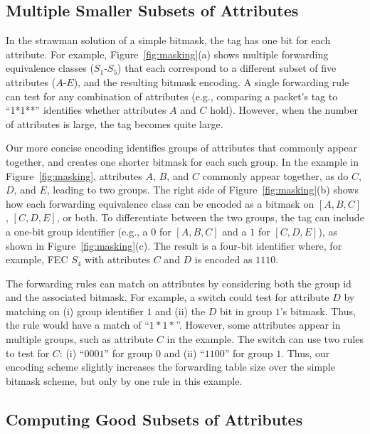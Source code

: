 \subsection{Multiple Smaller Subsets of Attributes}
\label{ssec:mset}
In the strawman solution of a simple bitmask, the tag has one bit for
each attribute.  For example, Figure~\ref{fig:masking}(a) shows
multiple forwarding equivalence classes ($S_1$-$S_5$) that each
correspond to a different subset of five attributes ($A$-$E$), and the
resulting bitmask encoding.  A single forwarding rule can test for any
combination of attributes (e.g., comparing a packet's tag to ``1*1**''
identifies whether attributes $A$ and $C$ hold).  However, when the
number of attributes is large, the tag becomes quite large.

Our more concise encoding identifies groups of attributes that
commonly appear together, and creates one shorter bitmask for each
such group.  In the example in Figure~\ref{fig:masking}, attributes
$A$, $B$, and $C$ commonly appear together, as do $C$, $D$, and $E$,
leading to two groups.  The right side of Figure~\ref{fig:masking}(b)
shows how each forwarding equivalence class can be encoded as a
bitmask on $[A,B,C]$, $[C,D,E]$, or both.  To differentiate between
the two groups, the tag can include a one-bit group identifier (e.g.,
a $0$ for $[A,B,C]$ and a $1$ for $[C,D,E]$), as shown in
Figure~\ref{fig:masking}(c).  The result is a four-bit identifier
where, for example, FEC $S_4$ with attributes $C$ and $D$ is encoded
as $1110$.

The forwarding rules can match on attributes by considering both the
group id and the associated bitmask.  For example, a switch could test
for attribute $D$ by matching on (i) group identifier $1$ and (ii) the
$D$ bit in group $1$'s bitmask.  Thus, the rule would have a match of
``$1*1*$''.  However, some attributes appear in multiple groups, such
as attribute $C$ in the example.  The switch can use two rules to test
for $C$: (i) ``$0001$'' for group $0$ and (ii) ``$1100$'' for group
$1$.  Thus, our encoding scheme slightly increases the forwarding
table size over the simple bitmask scheme, but only by one rule in
this example.

\subsection{Computing Good Subsets of Attributes}
\label{ssec:merge}




